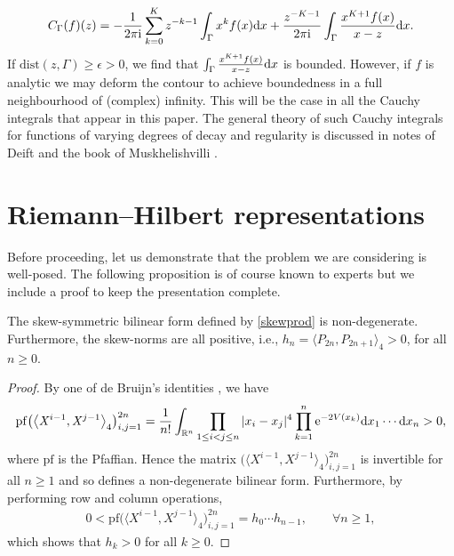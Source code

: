 \begin{enumerate}
\begin{align*}
C_\Gamma (f)(z) = - \frac{1}{2\pi {\rm i}} \sum_{k=0}^K z^{-k-1} \int_\Gamma x^k f(x) {\rm d}x +\frac{z^{-K-1}}{2\pi {\rm i} } \int_\Gamma \frac{ x^{K+1} f(x)}{x-z} {\rm d}x .
\end{align*}
If $\mathrm{dist}(z,\Gamma) \geq \epsilon > 0$, we find that $\int_\Gamma \frac{ x^{K+1} f(x)}{x-z} {\rm d}x$ is bounded. However, if $f$ is analytic we may deform the contour to achieve boundedness in a full neighbourhood of (complex) infinity. This will be the case in all the Cauchy integrals that appear in this paper. The general theory of such Cauchy integrals for functions of varying degrees of decay and regularity is discussed in notes of Deift \cite{deift2019riemannhilbert} and the book of Muskhelishvilli \cite{singular}.
\end{enumerate}

\section{Riemann--Hilbert representations}\label{rhpsection}

Before proceeding, let us demonstrate that the problem we are considering is well-posed. The following proposition is of course known to experts but we include a proof to keep the presentation complete.
\begin{Proposition} The skew-symmetric bilinear form defined by \eqref{skewprod} is non-degenerate. Furthermore, the skew-norms are all positive, i.e., $h_n = \langle P_{2n}, P_{2n+1} \rangle_4 > 0$, for all $n \geq 0$.
\end{Proposition}
\begin{proof}
By one of de Bruijn's identities \cite{debruijn}, we have
\begin{equation*}
\mathrm{pf} \big( \big\langle \mathit{X}^{i-1}, \mathit{X}^{j-1} \big\rangle_4 \big)_{i,j=1}^{2n} = \frac{1}{n!} \int_{\mathbb{R}^n} \prod_{1 \leq i < j \leq n} |x_i - x_j|^4 \prod_{k=1}^n {\rm e}^{-2V(x_k)} {\rm d} x_1 \cdots {\rm d}x_n > 0,
\end{equation*}
where $\mathrm{pf}$ is the Pfaffian. Hence the matrix $\big( \big\langle \mathit{X}^{i-1}, \mathit{X}^{j-1} \big\rangle_4 \big)_{i,j=1}^{2n}$ is invertible for all $n \geq 1$ and so defines a non-degenerate bilinear form. Furthermore, by performing row and column operations,
 \begin{align*}
0 < \mathrm{pf} \big( \big\langle \mathit{X}^{i-1}, \mathit{X}^{j-1} \big\rangle_4 \big)_{i,j=1}^{2n} = h_0 \cdots h_{n-1},\qquad \forall n \geq 1,
\end{align*}
which shows that $h_k > 0$ for all $k \geq 0$.
\end{proof}

